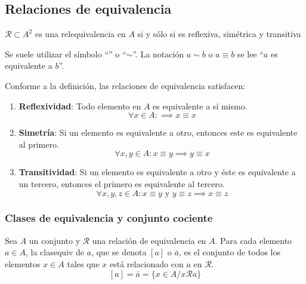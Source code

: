 \subsection{Relaciones de equivalencia}
\vspace{3mm} 
\begin{fmd-definition}
	$\mathcal{R} \subset A^2$ es una \gls{relequivalencia} en $A$ si y sólo si es reflexiva, simétrica y transitiva
\end{fmd-definition}

Se suele utilizar el símbolo ``'' o ``$\sim$''. La notación $a \sim b$ o $a \equiv b$ se lee ``$a$ es equivalente a $b$''.

Conforme a la definición, las relaciones de equivalencia satisfacen:

\begin{enumerate}[label=\roman*)]
	\item \textbf{Reflexividad}: Todo elemento en $A$ es equivalente a sí mismo.
	\[ \forall x \in A: \implies x \equiv x \]
	
	\item \textbf{Simetría}: Si un elemento es equivalente a otro, entonces este es equivalente al primero.
	\[ \forall x, y \in A: x \equiv y \implies y \equiv x \]
	
	\item \textbf{Transitividad}: Si un elemento es equivalente a otro y éste es equivalente a un tercero, entonces el primero es equivalente al tercero.
	\[ \forall x, y, z \in A: x \equiv y \text{ y } y \equiv z \implies x \equiv z \]
\end{enumerate}

\subsubsection{Clases de equivalencia y conjunto cociente}
\vspace{3mm} 
\begin{fmd-definition}
	Sea $A$ un conjunto y $\mathcal{R}$ una relación de equivalencia en $A$. Para cada elemento $a \in A$, la \gls{clasequiv} de $a$, que se denota $[a]$ o $\bar{a}$, es el conjunto de todos los elementos $x \in A$ tales que $x$ está relacionado con $a$ en $\mathcal{R}$.
	\[ [a] = \bar{a} = \{ x \in A / x \mathcal{R} a \}\]
\end{fmd-definition}

